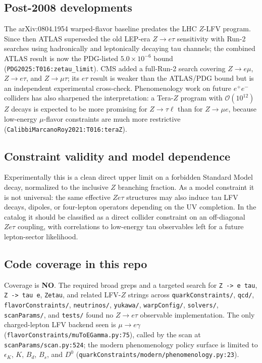 \subsection*{Post-2008 developments}
The arXiv:0804.1954 warped-flavor baseline predates the LHC \(Z\)-LFV program.
Since then ATLAS superseded the old LEP-era \(Z\to e\tau\) sensitivity with
Run-2 searches using hadronically and leptonically decaying tau channels; the
combined ATLAS result is now the PDG-listed \(5.0\times10^{-6}\) bound
(\texttt{PDG2025:T016:zetau\_limit}).  CMS added a full-Run-2 search covering
\(Z\to e\mu\), \(Z\to e\tau\), and \(Z\to\mu\tau\); its \(e\tau\) result is
weaker than the ATLAS/PDG bound but is an independent experimental cross-check.
Phenomenology work on future
\(e^+e^-\) colliders has also sharpened the interpretation: a Tera-\(Z\)
program with \(\mathcal{O}(10^{12})\) \(Z\) decays is expected to be more
promising for \(Z\to\tau\ell\) than for \(Z\to\mu e\), because low-energy
\(\mu\)-flavor constraints are much more restrictive
(\texttt{CalibbiMarcanoRoy2021:T016:teraZ}).

\subsection*{Constraint validity and model dependence}
Experimentally this is a clean direct upper limit on a forbidden Standard
Model decay, normalized to the inclusive \(Z\) branching fraction.  As a model
constraint it is not universal: the same effective \(Z e\tau\) structures may
also induce tau LFV decays, dipoles, or four-lepton operators depending on the
UV completion.  In the catalog it should be classified as a direct collider
constraint on an off-diagonal \(Z e\tau\) coupling, with correlations to
low-energy tau observables left for a future lepton-sector likelihood.

\subsection*{Code coverage in this repo}
Coverage is \textbf{NO}.  The required broad greps and a targeted search for
\texttt{Z -> e tau}, \texttt{Z -> tau e}, \texttt{Zetau}, and related
LFV-\(Z\) strings across \texttt{quarkConstraints/}, \texttt{qcd/},
\texttt{flavorConstraints/}, \texttt{neutrinos/}, \texttt{yukawa/},
\texttt{warpConfig/}, \texttt{solvers/}, \texttt{scanParams/}, and
\texttt{tests/} found no \(Z\to e\tau\) observable implementation.  The only
charged-lepton LFV backend seen is \(\mu\to e\gamma\)
(\texttt{flavorConstraints/muToEGamma.py:75}), called by the scan at
\texttt{scanParams/scan.py:524}; the modern phenomenology policy surface is
limited to \(\epsilon_K\), \(K\), \(B_d\), \(B_s\), and \(D^0\)
(\texttt{quarkConstraints/modern/phenomenology.py:23}).

